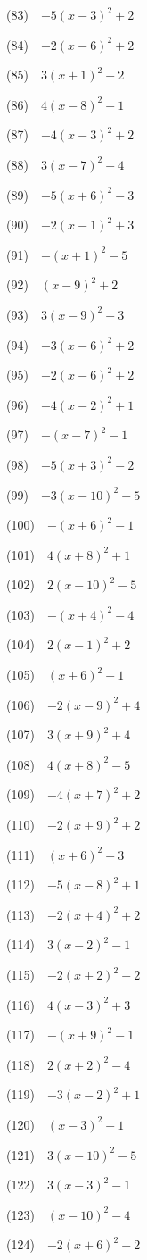 \documentclass[a4j,twocolumn,10pt,fleqn]{jarticle}
\begin{document}
(83)~~$-5(x-3)^2 +2$

(84)~~$-2(x-6)^2 +2$

(85)~~$3(x +1)^2 +2$

(86)~~$4(x-8)^2 +1$

(87)~~$-4(x-3)^2 +2$

(88)~~$3(x-7)^2-4$

(89)~~$-5(x +6)^2-3$

(90)~~$-2(x-1)^2 +3$

(91)~~$-(x +1)^2-5$

(92)~~$(x-9)^2 +2$

(93)~~$3(x-9)^2 +3$

(94)~~$-3(x-6)^2 +2$

(95)~~$-2(x-6)^2 +2$

(96)~~$-4(x-2)^2 +1$

(97)~~$-(x-7)^2-1$

(98)~~$-5(x +3)^2-2$

(99)~~$-3(x-10)^2-5$

(100)~~$-(x +6)^2-1$

(101)~~$4(x +8)^2 +1$

(102)~~$2(x-10)^2-5$

(103)~~$-(x +4)^2-4$

(104)~~$2(x-1)^2 +2$

(105)~~$(x +6)^2 +1$

(106)~~$-2(x-9)^2 +4$

(107)~~$3(x +9)^2 +4$

(108)~~$4(x +8)^2-5$

(109)~~$-4(x +7)^2 +2$

(110)~~$-2(x +9)^2 +2$

(111)~~$(x +6)^2 +3$

(112)~~$-5(x-8)^2 +1$

(113)~~$-2(x +4)^2 +2$

(114)~~$3(x-2)^2-1$

(115)~~$-2(x +2)^2-2$

(116)~~$4(x-3)^2 +3$

(117)~~$-(x +9)^2-1$

(118)~~$2(x +2)^2-4$

(119)~~$-3(x-2)^2 +1$

(120)~~$(x-3)^2-1$

(121)~~$3(x-10)^2-5$

(122)~~$3(x-3)^2-1$

(123)~~$(x-10)^2-4$

(124)~~$-2(x +6)^2-2$
\end{document}
